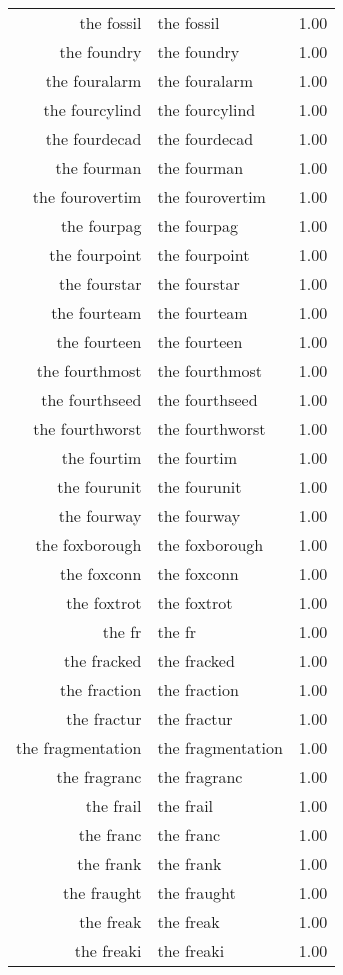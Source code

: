\begin{table}[ht]
\begin{tabular}{rlr}
  the fossil & the fossil & 1.00 \\ 
  the foundry & the foundry & 1.00 \\ 
  the fouralarm & the fouralarm & 1.00 \\ 
  the fourcylind & the fourcylind & 1.00 \\ 
  the fourdecad & the fourdecad & 1.00 \\ 
  the fourman & the fourman & 1.00 \\ 
  the fourovertim & the fourovertim & 1.00 \\ 
  the fourpag & the fourpag & 1.00 \\ 
  the fourpoint & the fourpoint & 1.00 \\ 
  the fourstar & the fourstar & 1.00 \\ 
  the fourteam & the fourteam & 1.00 \\ 
  the fourteen & the fourteen & 1.00 \\ 
  the fourthmost & the fourthmost & 1.00 \\ 
  the fourthseed & the fourthseed & 1.00 \\ 
  the fourthworst & the fourthworst & 1.00 \\ 
  the fourtim & the fourtim & 1.00 \\ 
  the fourunit & the fourunit & 1.00 \\ 
  the fourway & the fourway & 1.00 \\ 
  the foxborough & the foxborough & 1.00 \\ 
  the foxconn & the foxconn & 1.00 \\ 
  the foxtrot & the foxtrot & 1.00 \\ 
  the fr & the fr & 1.00 \\ 
  the fracked & the fracked & 1.00 \\ 
  the fraction & the fraction & 1.00 \\ 
  the fractur & the fractur & 1.00 \\ 
  the fragmentation & the fragmentation & 1.00 \\ 
  the fragranc & the fragranc & 1.00 \\ 
  the frail & the frail & 1.00 \\ 
  the franc & the franc & 1.00 \\ 
  the frank & the frank & 1.00 \\ 
  the fraught & the fraught & 1.00 \\ 
  the freak & the freak & 1.00 \\ 
  the freaki & the freaki & 1.00 \\ 

\end{tabular}
\end{table}

